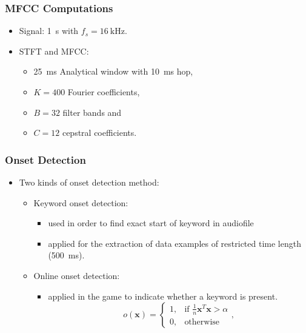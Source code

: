 \begin{frame}
  \frametitle{MFCC Computations}
  \vspace{-1cm}
  \begin{itemize}
    \item Signal: \SI{1}{\second} with $f_s = \SI{16}{\kilo\hertz}$.
    \item STFT and MFCC:
    \vspace{-0.1cm}
    \begin{itemize}
      \footnotesize
      \item \SI{25}{\milli\second} Analytical window with \SI{10}{\milli\second} hop,
      \item $K = 400$ Fourier coefficients,
      \item $B = 32$ filter bands and 
      \item $C=12$ cepstral coefficients.
    \end{itemize}
  \end{itemize}
  \vspace{-0.5cm}
  
\end{frame}


\begin{frame}
  \frametitle{Onset Detection}
  \vspace{-0.75cm}
  \begin{itemize}
    \item Two kinds of onset detection method:
    \begin{itemize}
      \item Keyword onset detection:
        \begin{itemize}
          \item used in order to find exact start of keyword in audiofile
          \item applied for the extraction of data examples of restricted time length (\SI{500}{\milli\second}).
        \end{itemize}
      \item Online onset detection:
        \begin{itemize}
          \item applied in the game to indicate whether a keyword is present.
          \begin{equation*}
            o(\bm{x}) = 
            \begin{cases}
              1, & \text{if } \frac{1}{n} \bm{x}^T \bm{x} > \alpha\\
              0, & \text{otherwise} 
            \end{cases},
          \end{equation*}
        \end{itemize}
    \end{itemize}
  \end{itemize}
\end{frame}

